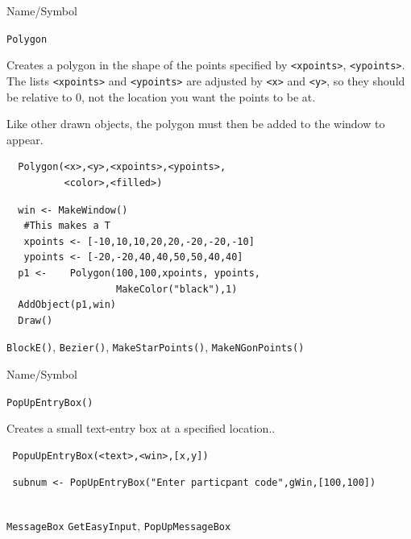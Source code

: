 \begin{desc}{Name/Symbol}
\item[Name/Symbol]  	\verb+Polygon+ 

\item[Description] Creates a polygon in the shape of the points
specified by \verb+<xpoints>+, \verb+<ypoints>+. The lists \verb+<xpoints>+ and
\verb+<ypoints>+ are adjusted by  \verb+<x>+ and \verb+<y>+, so they
should be relative to 0, not the location you want the points to be at.

Like other drawn objects, the polygon must then be added to the window
to appear.

\item[Usage]		
\begin{verbatim}
  Polygon(<x>,<y>,<xpoints>,<ypoints>,
          <color>,<filled>)
\end{verbatim}

\item[Example]	
\begin{verbatim}
  win <- MakeWindow()
   #This makes a T
   xpoints <- [-10,10,10,20,20,-20,-20,-10]
   ypoints <- [-20,-20,40,40,50,50,40,40]
  p1 <-    Polygon(100,100,xpoints, ypoints,
                   MakeColor("black"),1)
  AddObject(p1,win)
  Draw()
\end{verbatim}

\item[See Also]   
\verb+BlockE()+, \verb+Bezier()+, \verb+MakeStarPoints()+,
\verb+MakeNGonPoints()+
\end{desc}





\begin{desc}{Name/Symbol}
\item[Name/Symbol]	\verb+PopUpEntryBox()+ 

\item[Description]	Creates a small text-entry box at a specified location..

\item[Usage]		
\begin{verbatim}
 PopuUpEntryBox(<text>,<win>,[x,y])

\end{verbatim}

\item[Example]	
\begin{verbatim}
 subnum <- PopUpEntryBox("Enter particpant code",gWin,[100,100])
 
\end{verbatim}

\item[See Also]     
\verb+MessageBox+ \verb+GetEasyInput+, \verb+PopUpMessageBox+
\end{desc}

